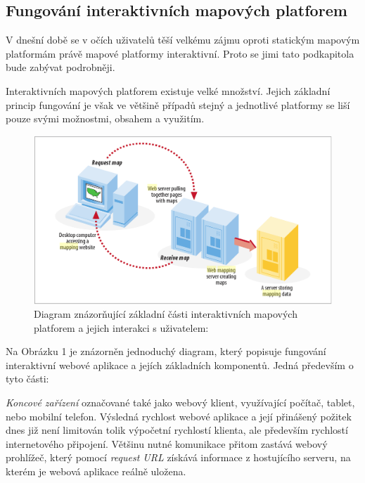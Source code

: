 \newpage
\subsection{Fungování interaktivních mapových platforem}
\label{sssec:fungovani-platforem}

V dnešní době se v očích uživatelů těší velkému zájmu oproti statickým mapovým platformám právě mapové platformy interaktivní. Proto se jimi tato podkapitola bude
zabývat podrobněji.

Interaktivních mapových platforem existuje velké množství. Jejich
základní princip fungování je však ve většině případů stejný a jednotlivé 
platformy se liší pouze svými možnostmi, obsahem a využitím.

\begin{figure}[h!]
	\centering
	\includegraphics[width=1\textwidth]{./img/map-web-diagram.png}
	\caption{Diagram znázorňující základní části interaktivních mapových platforem a jejich interakci s uživatelem: \cite{web_mapping}}
	\label{fig:WPS_class_diagram}
\end{figure}

Na Obrázku 1 je znázorněn jednoduchý diagram, který popisuje fungování
interaktivní webové aplikace a jejích základních komponentů. Jedná především o tyto části:

\textit{Koncové zařízení} označované také jako webový klient,
využívající počítač, tablet, nebo mobilní telefon. Výsledná rychlost webové aplikace a její přinášený požitek dnes již není limitován tolik výpočetní
rychlostí klienta, ale především rychlostí internetového
připojení. Většinu nutné komunikace přitom zastává webový prohlížeč,
který pomocí \textit{request URL} získává informace z hostujícího
serveru, na kterém je webová aplikace reálně uložena.

